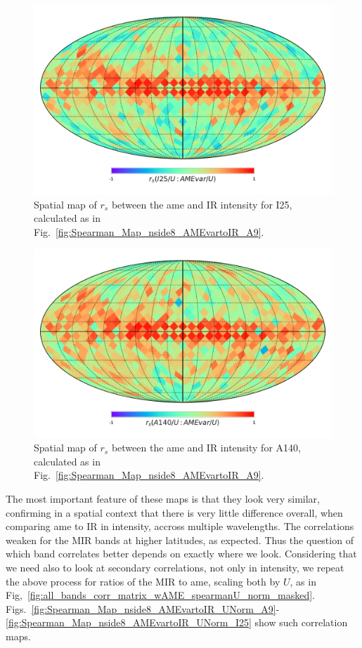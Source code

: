       \begin{figure}
        \includegraphics[width=\textwidth/2]{../Plots/Allsky_Corr/Spearman_Map_nside8_I25toAMEvar.pdf}
        \centering
        \caption{Spatial map of $r_{s}$ between the \acrshort{ame} and IR intensity for I25, calculated as in Fig.~\ref{fig:Spearman_Map_nside8_AMEvartoIR_A9}.}
        \label{fig:Spearman_Map_nside8_AMEvartoIR_I25}
      \end{figure}
      \begin{figure}
        \includegraphics[width=\textwidth/2]{../Plots/Allsky_Corr/Spearman_Map_nside8_A140toAMEvar.pdf}
        \centering
        \caption{Spatial map of $r_{s}$ between the \acrshort{ame} and IR intensity for A140, calculated as in Fig.~\ref{fig:Spearman_Map_nside8_AMEvartoIR_A9}.}
        \label{fig:Spearman_Map_nside8_AMEvartoIR_A140}
      \end{figure}
  The most important feature of these maps is that they look very similar, confirming in a spatial context that there is very little difference overall, when comparing \acrshort{ame} to IR in intensity, accross multiple wavelengths. The correlations weaken for the MIR bands at higher latitudes, as expected. Thus the question of which band correlates better depends on exactly where we look. Considering that we need also to look at secondary correlations, not only in intensity, we repeat the above process for ratios of the MIR to \acrshort{ame}, scaling both by $U$, as in Fig,~\ref{fig:all_bands_corr_matrix_wAME_spearmanU_norm_masked}.  Figs.~\ref{fig:Spearman_Map_nside8_AMEvartoIR_UNorm_A9}-\ref{fig:Spearman_Map_nside8_AMEvartoIR_UNorm_I25} show such correlation maps.
